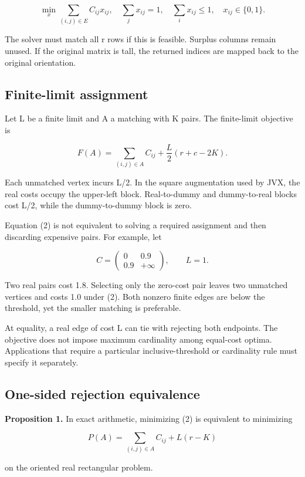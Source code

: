 \documentclass[11pt,a4paper]{article}
\begin{document}
\[
\min_x \sum_{(i,j)\in E} C_{ij}x_{ij},
\quad
\sum_j x_{ij}=1,\quad
\sum_i x_{ij}\leq 1,\quad
x_{ij}\in\{0,1\}.
\tag{1}
\]

The solver must match all r rows if this is feasible. Surplus columns remain unused. If the original matrix is tall, the returned indices are mapped back to the original orientation.

\noindent\begin{minipage}{\linewidth}
\subsection{Finite-limit assignment}\label{sec:finite-limit}

Let L be a finite limit and A a matching with K pairs. The finite-limit objective is

\[
F(A)=\sum_{(i,j)\in A}C_{ij}
     +\frac{L}{2}(r+c-2K).
\tag{2}
\]
\end{minipage}

Each unmatched vertex incurs L/2. In the square augmentation used by JVX, the real costs occupy the upper-left block. Real-to-dummy and dummy-to-real blocks cost L/2, while the dummy-to-dummy block is zero.

Equation (2) is not equivalent to solving a required assignment and then discarding expensive pairs. For example, let

\[
C=\begin{pmatrix}0&0.9\\0.9&+\infty\end{pmatrix},\qquad L=1.
\]

Two real pairs cost 1.8. Selecting only the zero-cost pair leaves two unmatched vertices and costs 1.0 under (2). Both nonzero finite edges are below the threshold, yet the smaller matching is preferable.

At equality, a real edge of cost L can tie with rejecting both endpoints. The objective does not impose maximum cardinality among equal-cost optima. Applications that require a particular inclusive-threshold or cardinality rule must specify it separately.

\subsection{One-sided rejection equivalence}\label{sec:one-sided}

\noindent\begin{minipage}{\linewidth}
\textbf{Proposition 1.} In exact arithmetic, minimizing (2) is equivalent to minimizing

\[
P(A)=\sum_{(i,j)\in A}C_{ij}+L(r-K)
\tag{3}
\]

\end{minipage}
on the oriented real rectangular problem.
\end{document}

